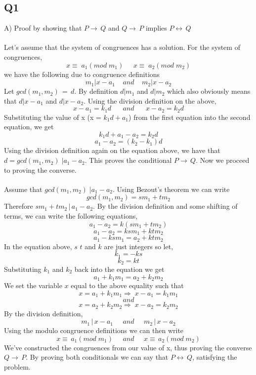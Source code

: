 \documentclass[12pt, oneside]{article}
\begin{document}
\subsection*{Q1}
A) Proof by showing that $P\rightarrow\,Q$ and $Q\rightarrow\,P$ implies $P\leftrightarrow\,Q$
\\\\
Let's assume that the system of congruences has a solution. For the system of congruences,
\[x\equiv\;a_{1} (mod\;m_{1})\;\;\;\;\; x\equiv\;a_{2} (mod\;m_{2})\]
we have the following due to congruence definitions
\[m_{1} | x-a_{1}\;\;\;\;and\;\;\;\;m_{2}|x-a_{2}\]
Let $gcd(m_{1},m_{2})\,=\,d$. By definition $d|m_{1}$ and $d|m_{2}$ which also obviously means that $d|x-a_{1}$ and $d|x-a_{2}$. Using the division definition on the above,
\[x-a_{1}=k_{1}d\;\;\;\;\;\;and\;\;\;\;\;\; x-a_{2}=k_{2}d\]
Substituting the value of x (x = $k_{1}d+a_{1}$) from the first equation into the second equation, we get
\[k_{1}d+a_{1}-a_{2}=k_{2}d\]
\[a_{1}-a_{2}=(k_{2}-k_{1})d\]
Using the division definition again on the equation above, we have that $d=gcd(m_{1},m_{2})\;|a_{1}-a_{2}$. This proves the conditional $P\rightarrow\,Q$. Now we proceed to proving the converse.
\\\\
Assume that $gcd(m_{1},m_{2})\;|a_{1}-a_{2}$. Using Bezout's theorem we can write
\[gcd(m_{1},m_{2}) = sm_{1} + tm_{2}\]
Therefore $sm_{1} + tm_{2}\,|\,a_{1}-a_{2}$. By the division definition and some shifting of terms, we can write the following equations,
\[a_{1}-a_{2} = k(sm_{1} + tm_{2})\]
\[a_{1}-a_{2} = ksm_{1} + ktm_{2}\]
\[a_{1} - ksm_{1} = a_{2} + ktm_{2}\]
In the equation above, $s$ $t$ and $k$ are just integers so let,
\[k_{1} = -ks\]
\[k_{2} = kt\]
Substituting $k_{1}$ and $k_{2}$ back into the equation we get
\[a_{1} + k_{1}m_{1} = a_{2} + k_{2}m_{2}\]
We set the variable $x$ equal to the above equality such that
\[x = a_{1} + k_{1}m_{1} \Longrightarrow\;x-a_{1} = k_{1}m_{1}\]
\[and\]
\[x = a_{2} + k_{2}m_{2} \Longrightarrow\;x-a_{2} = k_{2}m_{2}\]
By the division definition,
\[m_{1}\,|\,x-a_{1}\;\;\;\;\;and\;\;\;\;\;m_{2}\,|\,x-a_{2}\]
Using the modulo congruence definitions we can then write
\[x\equiv\,a_{1} (mod\;m_{1})\;\;\;\;\;and\;\;\;\;\;x\equiv\,a_{2} (mod\;m_{2})\]
We've constructed the congruences from our value of x, thus proving the converse $Q\rightarrow\,P$. By proving both conditionals we can say that $P\leftrightarrow\,Q$, satisfying the problem.
\\
\end{document}
